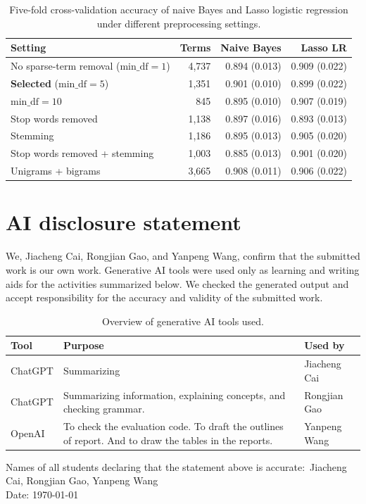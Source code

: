 \documentclass[onecolumn]{jmlr}
\begin{document}
\begin{table}[ht]
\centering
\caption{Five-fold cross-validation accuracy of naive Bayes and Lasso logistic regression under different preprocessing settings.}
\label{tab:prep}
\small
\begin{tabular}{@{}lrrr@{}}
\toprule
Setting & Terms & Naive Bayes & Lasso LR \\
\midrule
No sparse-term removal ($\mathrm{min\_df}=1$) & 4,737 & 0.894 (0.013) & 0.909 (0.022) \\
\textbf{Selected} ($\mathrm{min\_df}=5$) & 1,351 & 0.901 (0.010) & 0.899 (0.022) \\
$\mathrm{min\_df}=10$ & 845 & 0.895 (0.010) & 0.907 (0.019) \\
Stop words removed & 1,138 & 0.897 (0.016) & 0.893 (0.013) \\
Stemming & 1,186 & 0.895 (0.013) & 0.905 (0.020) \\
Stop words removed + stemming & 1,003 & 0.885 (0.013) & 0.901 (0.020) \\
Unigrams + bigrams & 3,665 & 0.908 (0.011) & 0.906 (0.022) \\
\bottomrule
\end{tabular}
\end{table}

\clearpage
\section*{AI disclosure statement}

We, Jiacheng Cai, Rongjian Gao, and Yanpeng Wang, confirm that the submitted work is our own work. Generative AI tools were used only as learning and writing aids for the activities summarized below. We checked the generated output and accept responsibility for the accuracy and validity of the submitted work.

\begin{table}[h!]
\centering
\small
\begin{tabular}{@{}p{1.8cm}p{9.0cm}p{2.5cm}@{}}
\toprule
Tool & Purpose & Used by \\
\midrule
ChatGPT & Summarizing  & Jiacheng Cai \\
\midrule
ChatGPT & Summarizing information, explaining concepts, and checking grammar. & Rongjian Gao \\
\midrule
OpenAI & To check the evaluation code. To draft the outlines of report. And to draw the tables in the reports. & Yanpeng Wang \\
\bottomrule
\end{tabular}
\caption{Overview of generative AI tools used.}
\label{tab:ai-tools}
\end{table}

\noindent Names of all students declaring that the statement above is accurate:\
Jiacheng Cai, Rongjian Gao, Yanpeng Wang\\
Date: \today
\end{document}
